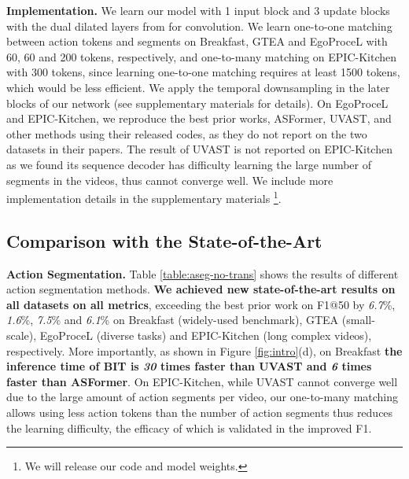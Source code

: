 \documentclass[10pt,twocolumn,letterpaper]{article}
\newcommand{\headline}[1]{\noindent \textbf{#1}}
\newcommand{\0}{\boldsymbol{0}}
\begin{document}
\headline{Implementation.}
We learn our model with 1 input block and 3 update blocks with the dual dilated layers from \cite{Li:TPAMI20} for convolution.
We learn one-to-one matching between action tokens and segments on Breakfast, GTEA and EgoProceL with 60, 60 and 200 tokens, respectively, and one-to-many matching on EPIC-Kitchen with 300 tokens, since learning one-to-one matching requires at least 1500 tokens, which would be less efficient. We apply the temporal downsampling in the later blocks of our network (see supplementary materials for details). 
On EgoProceL and EPIC-Kitchen, we reproduce the best prior works, ASFormer, UVAST, and other methods \cite{Farha:CVPR19,Li:TPAMI20,Ishikawa:WACV21} using their released codes, as they do not report on the two datasets in their papers.
The result of UVAST is not reported on EPIC-Kitchen as we found its sequence decoder has difficulty learning the large number of segments in the videos, thus cannot converge well.
We include more implementation details in the supplementary materials \footnote{We will release our code and model weights.}.


\subsection{Comparison with the State-of-the-Art}

\headline{Action Segmentation.}
Table \ref{table:aseg-no-trans} shows the results of different action segmentation methods. 
\textbf{We achieved new state-of-the-art results on all datasets on all metrics}, exceeding the best prior work on F1@50 by \textit{6.7}\%, \textit{1.6}\%, \textit{7.5}\% and \textit{6.1}\% on Breakfast (widely-used benchmark), GTEA (small-scale), EgoProceL (diverse tasks) and EPIC-Kitchen (long complex videos), respectively. 
More importantly, as shown in Figure \ref{fig:intro}(d), on Breakfast \textbf{the inference time of BIT is \textit{30} times faster than UVAST and \textit{6} times faster than ASFormer}.
On EPIC-Kitchen, while UVAST cannot converge well due to the large amount of action segments per video, our one-to-many matching allows using less action tokens than the number of action segments thus reduces the learning difficulty, the efficacy of which is validated in the improved F1.
\end{document}
